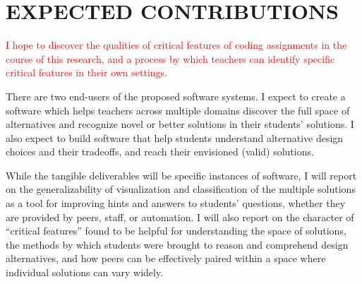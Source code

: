 \documentclass[12pt]{article}
\begin{document}
\section{EXPECTED CONTRIBUTIONS}

\textcolor{red}{I hope to discover the qualities of critical features of coding assignments in the course of this research, and a process by which teachers can identify specific critical features in their own settings.}


There are two end-users of the proposed software systems. I expect to create a software which helps teachers across multiple domains discover the full space of alternatives and recognize novel or better solutions in their students' solutions. I also expect to build software that help students understand alternative design choices and their tradeoffs, and reach their envisioned (valid) solutions.

While the tangible deliverables will be specific instances of software, I will report on the generalizability of visualization and classification of the multiple solutions as a tool for improving hints and answers to students' questions, whether they are provided by peers, staff, or automation. I will also report on the character of ``critical features'' found to be helpful for understanding the space of solutions, the methods by which students were brought to reason and comprehend design alternatives, and how peers can be effectively paired within a space where individual solutions can vary widely.

%
%
%
%

\end{document}
